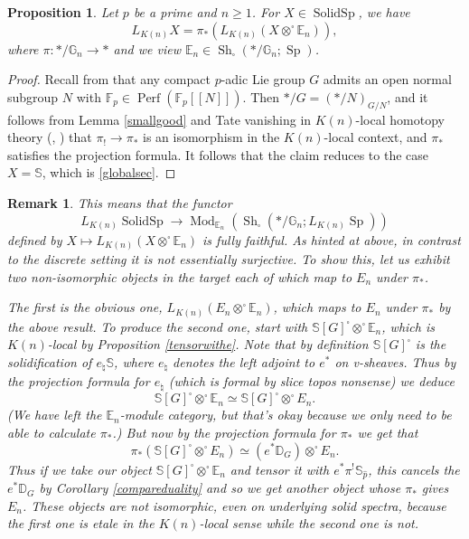 \documentclass[12pt]{article}
\newtheorem{proposition}[theorem]{Proposition}
\newtheorem{remark}[theorem]{Remark}
\newcommand{\on}{\operatorname}
\newcommand{\mbb}{\mathbb}
\newcommand{\solid}{\square}
\newcommand{\wh}{\widehat}
\begin{document}
\begin{proposition}\label{halfofdescent}
Let $p$ be a prime and $n\geq 1$.  For $X\in \on{SolidSp}$, we have
$$L_{K(n)}X = \pi_\ast(L_{K(n)}(X\otimes^\square \mathbb{E}_n)),$$
where $\pi:\ast/\mathbb{G}_n\to\ast$ and we view $\mathbb{E}_n\in\on{Sh}_\square(\ast/\mathbb{G}_n;\on{Sp})$.
\end{proposition}
\begin{proof}
Recall from \cite{LazardGroupes} that any compact $p$-adic Lie group $G$ admits an open normal subgroup $N$ with $\mbb{F}_p\in\on{Perf}(\mathbb{F}_p[[N]])$.  Then $\ast/G = (\ast/N)_{G/N}$, and it follows from Lemma \ref{smallgood} and Tate vanishing in $K(n)$-local homotopy theory (\cite{GreenleesTate}, \cite{KuhnTate}) that $\pi_!\to\pi_\ast$ is an isomorphism in the $K(n)$-local context, and $\pi_\ast$ satisfies the projection formula.  It follows that the claim reduces to the case $X=\mathbb{S}$, which is \ref{globalsec}.
\end{proof}

\begin{remark}\label{nottheotherhalf}
This means that the functor
$$L_{K(n)}\on{SolidSp} \to \on{Mod}_{\mbb{E}_n}(\on{Sh}_{\square}(\ast/\mbb{G}_n;L_{K(n)}\on{Sp}))$$
defined by $X\mapsto L_{K(n)}(X\otimes^{\square}\mbb{E}_n)$ is fully faithful.  As hinted at above, in contrast to the discrete setting it is not essentially surjective.  To show this, let us exhibit two non-isomorphic objects in the target each of which map to $E_n$ under $\pi_\ast$.

The first is the obvious one, $L_{K(n)}(E_n\otimes^{\square}\mbb{E}_n)$, which maps to $E_n$ under $\pi_\ast$ by the above result.  To produce the second one, start with $\mbb{S}[G]^\square \otimes^\square \mbb{E}_n$, which is $K(n)$-local by Proposition \ref{tensorwithe}.  Note that by definition $\mbb{S}[G]^\square$ is the solidification of $e_\natural \mbb{S}$, where $e_\natural$ denotes the left adjoint to $e^\ast$ on v-sheaves.  Thus by the projection formula for $e_\natural$ (which is formal by slice topos nonsense) we deduce
$$\mbb{S}[G]^\square \otimes^\square \mbb{E}_n\simeq \mbb{S}[G]^\square \otimes^\square E_n.$$
(We have left the $\mbb{E}_n$-module category, but that's okay because we only need to be able to calculate $\pi_\ast$.)  But now by the projection formula for $\pi_\ast$ we get that
$$\pi_\ast (\mbb{S}[G]^\square\otimes^{\solid} E_n)\simeq (e^\ast\mbb{D}_G)\otimes^\square E_n.$$
Thus if we take our object $\mbb{S}[G]^\square\otimes^\solid\mbb{E}_n$ and tensor it with $e^\ast \pi^!\mbb{S}_{\wh{p}}$, this cancels the $e^\ast\mbb{D}_G$ by Corollary \ref{compareduality} and so we get another object whose $\pi_\ast$ gives $E_n$.  These objects are not isomorphic, even on underlying solid spectra, because the first one is etale in the $K(n)$-local sense while the second one is not.
\end{remark}
\end{document}
